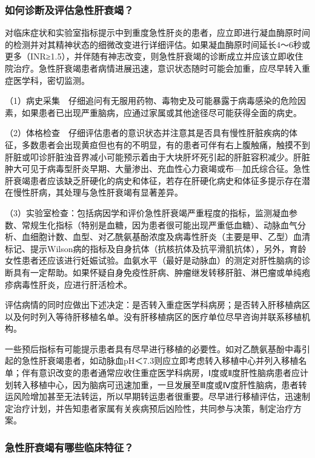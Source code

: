 \subsubsection{如何诊断及评估急性肝衰竭？}

对临床症状和实验室指标提示中到重度急性肝炎的患者，应立即进行凝血酶原时间的检测并对其精神状态的细微改变进行详细评估。如果凝血酶原时间延长4～6秒或更多（INR≥1.5），并伴随有神志改变，则急性肝衰竭的诊断成立并应该立即收住院治疗。急性肝衰竭患者病情进展迅速，意识状态随时可能会加重，应尽早转入重症医学科，密切监测。

（1）病史采集　仔细追问有无服用药物、毒物史及可能暴露于病毒感染的危险因素，如果患者已出现严重脑病，应通过家属或其他途径尽可能获得全面的病史。

（2）体格检查　仔细评估患者的意识状态并注意其是否具有慢性肝脏疾病的体征，多数患者会出现黄疸但也有的不明显，有的患者可伴有右上腹触痛，触摸不到肝脏或叩诊肝脏浊音界减小可能预示着由于大块肝坏死引起的肝脏容积减少。肝脏肿大可见于病毒型肝炎早期、大量渗出、充血性心力衰竭或布---加氏综合征。急性肝衰竭患者应该缺乏肝硬化的病史和体征，若存在肝硬化病史和体征多提示存在潜在慢性肝病，其处理与急性肝衰竭有显著差异。

（3）实验室检查：包括病因学和评价急性肝衰竭严重程度的指标，监测凝血参数、常规生化指标（特别是血糖，因为患者很可能出现严重低血糖）、动脉血气分析、血细胞计数、血型、对乙酰氨基酚浓度及病毒性肝炎（主要是甲、乙型）血清标记、提示Wilson病的指标及自身抗体（抗核抗体及抗平滑肌抗体），另外，育龄女性患者还应该进行妊娠试验。血氨水平（最好是动脉血）的测定对肝性脑病的诊断具有一定帮助。如果怀疑自身免疫性肝病、肿瘤继发转移肝脏、淋巴瘤或单纯疱疹病毒性肝炎，应进行肝活检术。

评估病情的同时应做出下述决定：是否转入重症医学科病房；是否转入肝移植病区以及何时列入等待肝移植名单。没有肝移植病区的医疗单位尽早咨询并联系移植机构。

一些预后指标有可能提示患者具有尽早进行移植的必要性。如对乙酰氨基酚中毒引起的急性肝衰竭患者，如动脉血pH＜7.3则应立即考虑转入移植中心并列入移植名单；伴有意识改变的患者通常应收住重症医学科病房，Ⅰ度或Ⅱ度肝性脑病患者应计划转入移植中心，因为脑病可迅速加重，一旦发展至Ⅲ度或Ⅳ度肝性脑病，患者转运风险增加甚至无法转运，所以早期转运患者很重要。尽早进行移植评估，迅速制定治疗计划，并告知患者家属有关疾病预后凶险性，共同参与决策，制定治疗方案。

\subsubsection{急性肝衰竭有哪些临床特征？}


